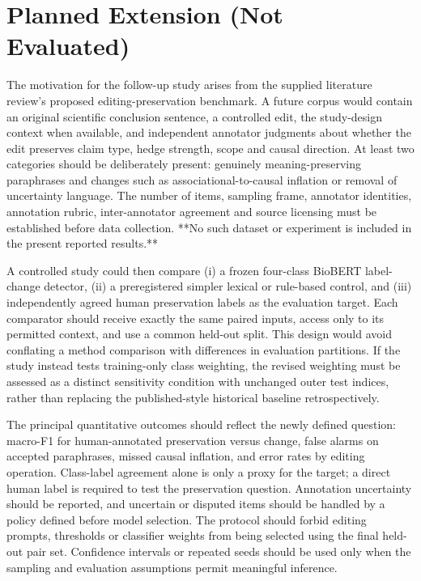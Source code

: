 \documentclass[conference]{IEEEtran}
\begin{document}
\section{Planned Extension (Not Evaluated)}\label{sec:future}
The motivation for the follow-up study arises from the supplied literature review's proposed editing-preservation benchmark. A future corpus would contain an original scientific conclusion sentence, a controlled edit, the study-design context when available, and independent annotator judgments about whether the edit preserves claim type, hedge strength, scope and causal direction. At least two categories should be deliberately present: genuinely meaning-preserving paraphrases and changes such as associational-to-causal inflation or removal of uncertainty language. The number of items, sampling frame, annotator identities, annotation rubric, inter-annotator agreement and source licensing must be established before data collection. **No such dataset or experiment is included in the present reported results.**

A controlled study could then compare (i) a frozen four-class BioBERT label-change detector, (ii) a preregistered simpler lexical or rule-based control, and (iii) independently agreed human preservation labels as the evaluation target. Each comparator should receive exactly the same paired inputs, access only to its permitted context, and use a common held-out split. This design would avoid conflating a method comparison with differences in evaluation partitions. If the study instead tests training-only class weighting, the revised weighting must be assessed as a distinct sensitivity condition with unchanged outer test indices, rather than replacing the published-style historical baseline retrospectively.

The principal quantitative outcomes should reflect the newly defined question: macro-F1 for human-annotated preservation versus change, false alarms on accepted paraphrases, missed causal inflation, and error rates by editing operation. Class-label agreement alone is only a proxy for the target; a direct human label is required to test the preservation question. Annotation uncertainty should be reported, and uncertain or disputed items should be handled by a policy defined before model selection. The protocol should forbid editing prompts, thresholds or classifier weights from being selected using the final held-out pair set. Confidence intervals or repeated seeds should be used only when the sampling and evaluation assumptions permit meaningful inference.
\end{document}
